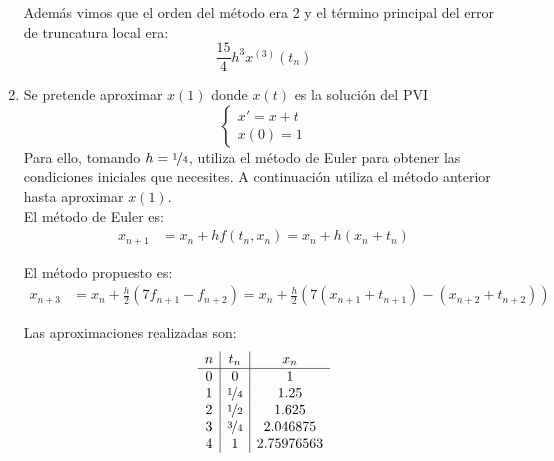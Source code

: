 \begin{ejercicio}[DGIIM 2023/24]
\begin{enumerate}
        Además vimos que el orden del método era 2 y el término principal del error de truncatura local era:
        \begin{equation*}
            \frac{15}{4}h^3x^{(3)}(t_n)
        \end{equation*}
        \item Se pretende aproximar $x(1)$ donde $x(t)$ es la solución del PVI
            \begin{equation*}
                \begin{cases}
                    x' = x + t \\
                    x(0) = 1
                \end{cases}
            \end{equation*}
            Para ello, tomando $h = \nicefrac{1}{4}$, utiliza el método de Euler para obtener las condiciones iniciales que necesites. A continuación utiliza el método anterior hasta aproximar $x(1)$.\\

            El método de Euler es:
            \begin{align*}
                x_{n+1} &= x_n + hf(t_n, x_n) = x_n + h(x_n + t_n)
            \end{align*}

            El método propuesto es:
            \begin{align*}
                x_{n+3} &= x_n + \frac{h}{2}\left(7 f_{n+1} - f_{n+2}\right) = x_n + \frac{h}{2}\left(7(x_{n+1} + t_{n+1}) - (x_{n+2} + t_{n+2})\right)
            \end{align*}

            Las aproximaciones realizadas son:
            \begin{equation*}
                \begin{array}{c|c|c}
                    n & t_n & x_n\\ \hline
                    0 & 0 & 1 \\
                    1 & \nicefrac{1}{4} & 1.25 \\
                    2 & \nicefrac{1}{2} & 1.625 \\
                    3 & \nicefrac{3}{4} & 2.046875 \\
                    4 & 1 & 2.75976563
                \end{array}
            \end{equation*}
    \end{enumerate}
\end{ejercicio}